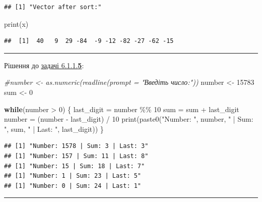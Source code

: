 \documentclass[
]{book}
\newenvironment{Shaded}{\begin{snugshade}}{\end{snugshade}}
\newcommand{\CommentTok}[1]{\textcolor[rgb]{0.56,0.35,0.01}{\textit{#1}}}
\newcommand{\ControlFlowTok}[1]{\textcolor[rgb]{0.13,0.29,0.53}{\textbf{#1}}}
\newcommand{\DecValTok}[1]{\textcolor[rgb]{0.00,0.00,0.81}{#1}}
\newcommand{\FunctionTok}[1]{\textcolor[rgb]{0.00,0.00,0.00}{#1}}
\newcommand{\NormalTok}[1]{#1}
\newcommand{\OtherTok}[1]{\textcolor[rgb]{0.56,0.35,0.01}{#1}}
\newcommand{\SpecialCharTok}[1]{\textcolor[rgb]{0.00,0.00,0.00}{#1}}
\newcommand{\StringTok}[1]{\textcolor[rgb]{0.31,0.60,0.02}{#1}}
\begin{document}
\begin{verbatim}
## [1] "Vector after sort:"
\end{verbatim}

\begin{Shaded}
\begin{Highlighting}[]
\FunctionTok{print}\NormalTok{(x)}
\end{Highlighting}
\end{Shaded}

\begin{verbatim}
##  [1]  40   9  29 -84  -9 -12 -82 -27 -62 -15
\end{verbatim}

\begin{center}\rule{0.5\linewidth}{0.5pt}\end{center}

Рішення до \protect\hyperlink{task6115}{задачі 6.1.1.\textbf{5}}:

\begin{Shaded}
\begin{Highlighting}[]
\CommentTok{\#number \textless{}{-} as.numeric(readline(prompt = "Введіть число:"))}
\NormalTok{number }\OtherTok{\textless{}{-}} \DecValTok{15783}
\NormalTok{sum }\OtherTok{\textless{}{-}} \DecValTok{0}

\ControlFlowTok{while}\NormalTok{(number }\SpecialCharTok{\textgreater{}} \DecValTok{0}\NormalTok{) \{}
\NormalTok{  last\_digit }\OtherTok{=}\NormalTok{ number }\SpecialCharTok{\%\%} \DecValTok{10}
\NormalTok{  sum }\OtherTok{=}\NormalTok{ sum }\SpecialCharTok{+}\NormalTok{ last\_digit}
\NormalTok{  number }\OtherTok{=}\NormalTok{ (number }\SpecialCharTok{{-}}\NormalTok{ last\_digit) }\SpecialCharTok{/} \DecValTok{10}
  \FunctionTok{print}\NormalTok{(}\FunctionTok{paste0}\NormalTok{(}\StringTok{"Number: "}\NormalTok{, number, }\StringTok{" | Sum: "}\NormalTok{, sum, }\StringTok{" | Last: "}\NormalTok{, last\_digit))}
\NormalTok{\}}
\end{Highlighting}
\end{Shaded}

\begin{verbatim}
## [1] "Number: 1578 | Sum: 3 | Last: 3"
## [1] "Number: 157 | Sum: 11 | Last: 8"
## [1] "Number: 15 | Sum: 18 | Last: 7"
## [1] "Number: 1 | Sum: 23 | Last: 5"
## [1] "Number: 0 | Sum: 24 | Last: 1"
\end{verbatim}

\begin{center}\rule{0.5\linewidth}{0.5pt}\end{center}
\end{document}

